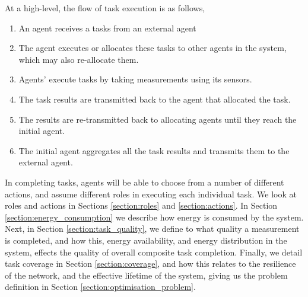 At a high-level, the flow of task execution is as follows,
\begin{enumerate}
	\item An agent receives a tasks from an external agent
	\item The agent executes or allocates these tasks to other agents in the system, which may also re-allocate them.
	\item Agents' execute tasks by taking measurements using its sensors.
	\item The task results are transmitted back to the agent that allocated the task.
	\item The results are re-transmitted back to allocating agents until they reach the initial agent.
	\item The initial agent aggregates all the task results and transmits them to the external agent.
\end{enumerate}
In completing tasks, agents will be able to choose from a number of different actions, and assume different roles in executing each individual task. We look at roles and actions in Sections \ref{section:roles} and \ref{section:actions}. In Section \ref{section:energy_consumption} we describe how energy is consumed by the system. Next, in Section \ref{section:task_quality}, we define to what quality a measurement is completed, and how this, energy availability, and energy distribution in the system, effects the quality of overall composite task completion. Finally, we detail task coverage in Section \ref{section:coverage}, and how this relates to the resilience of the network, and the effective lifetime of the system, giving us the problem definition in Section \ref{section:optimisation_problem}.

\begin{example}
\end{example}

